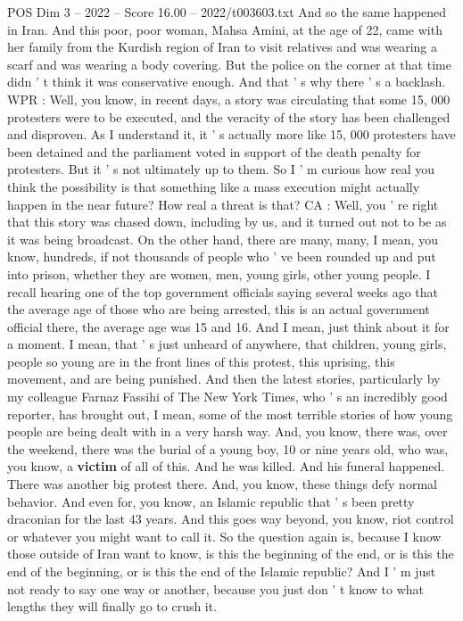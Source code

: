 \begin{textsample}{POS Dim 3 – 2022 – Score 16.00 – 2022/t003603.txt}
And so the same happened in Iran.
And this poor, poor woman, Mahsa Amini, at the age of 22, came with her family from the Kurdish region of Iran to visit relatives and was wearing a scarf and was wearing a body covering.
But the police on the corner at that time didn ' t think it was conservative enough.
And that ' s why there ' s a backlash.
WPR : Well, you know, in recent days, a story was circulating that some 15, 000 protesters were to be executed, and the veracity of the story has been challenged and disproven.
As I understand it, it ' s actually more like 15, 000 protesters have been detained and the parliament voted in support of the death penalty for protesters.
But it ' s not ultimately up to them.
So I ' m curious how real you think the possibility is that something like a mass execution might actually happen in the near future?
How real a threat is that?
CA : Well, you ' re right that this story was chased down, including by us, and it turned out not to be as it was being broadcast.
On the other hand, there are many, many, I mean, you know, hundreds, if not thousands of people who ' ve been rounded up and put into prison, whether they are women, men, young girls, other young people.
I recall hearing one of the top government officials saying several weeks ago that the average age of those who are being arrested, this is an actual government official there, the average age was 15 and 16.
And I mean, just think about it for a moment.
I mean, that ' s just unheard of anywhere, that children, young girls, people so young are in the front lines of this protest, this uprising, this movement, and are being punished.
And then the latest stories, particularly by my colleague Farnaz Fassihi of The New York Times, who ' s an incredibly good reporter, has brought out, I mean, some of the most terrible stories of how young people are being dealt with in a very harsh way.
And, you know, there was, over the weekend, there was the burial of a young boy, 10 or nine years old, who was, you know, a \textbf{victim} of all of this.
And he was killed.
And his funeral happened.
There was another big protest there.
And, you know, these things defy normal behavior.
And even for, you know, an Islamic republic that ' s been pretty draconian for the last 43 years.
And this goes way beyond, you know, riot control or whatever you might want to call it.
So the question again is, because I know those outside of Iran want to know, is this the beginning of the end, or is this the end of the beginning, or is this the end of the Islamic republic?
And I ' m just not ready to say one way or another, because you just don ' t know to what lengths they will finally go to crush it.

\end{textsample}
